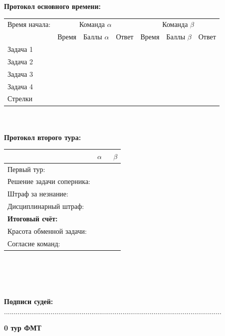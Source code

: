 \documentclass[12pt]{article}
\begin{document}
\begin{center}{\bf Протокол основного времени: } \\ 
\begin{tabular}{|p{3.3cm}|p{1.5cm}|p{2cm}|p{1.5cm}|p{1.5cm}|p{2cm}|p{1.5cm}|}
\hline Время начала: & \multicolumn{3}{c|}{Команда $\alpha$} & \multicolumn{3}{c|}{Команда $\beta$ }\\\cline{2-7} {} & Время & Баллы $\alpha$ & Ответ & Время & Баллы $\beta$ & Ответ \\\hline \hline \center Задача 1 &{}&{}&{}&{}&{}&{}\\[20mm]\hline \hline \center Задача 2 &{}&{}&{}&{}&{}&{}\\[20mm]\hline \hline \center Задача 3 &{}&{}&{}&{}&{}&{}\\[20mm]\hline \hline \center Задача 4 &{}&{}&{}&{}&{}&{}\\[20mm]\hline \hline \center Стрелки &{}&{}&{}&{}&{}&{}\\[20mm]\hline
\end{tabular}
$ $\\
$ $\\
{\bf Протокол второго тура: } \\ 
\begin{tabular}{ | p{7cm} | p{1cm} | p{1cm} |}
\hline
$ $ & \centering $\alpha$ & $\;$ $\beta$ \\ \hline\raggedleft Первый тур: & & \\ \hline\raggedleft Решение задачи соперника: & & \\ \hline\raggedleft Штраф за незнание: & & \\ \hline\raggedleft Дисциплинарный штраф: & & \\ \hline\raggedleft \bf Итоговый счёт: & & \\ \hline \hline\raggedleft Красота обменной задачи: & & \\ \hline\raggedleft Согласие команд: & & \\ \hline\end{tabular}\end{center}
$ $\\
$ $\\
$ $\\
$ $\\
{\bf Подписи судей: }................................................................................................................\newpage
\begin{center}
{\Huge \bf 0 тур ФМТ}
\end{center}
\end{document}
